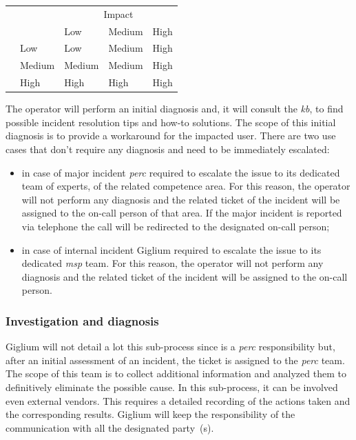 \begin{table}[H]
	\centering
	\begin{tabular}{ | l | l | l | l | l | }
		\cline{3-5}
		\multicolumn{2}{c|}{}& \multicolumn{3}{|c|}{Impact}  \\ \cline{3-5}
		\multicolumn{2}{c|}{} &Low & Medium  & High \\ \hline
		\multirow{3}{*}{\rotatebox{90}{\tiny Urgency\,}} & Low & \cellcolor{green}Low & \cellcolor{yellow}Medium & \cellcolor{red}High\\ \cline{2-5}
		&   Medium & \cellcolor{yellow}Medium & \cellcolor{yellow}Medium & \cellcolor{red}High \\ \cline{2-5}
		&  High & \cellcolor{red}High & \cellcolor{red}High & \cellcolor{red}High \\ \hline
	\end{tabular}
	\label{tab:incident-priority}
\end{table}

The operator will perform an initial diagnosis and, it will consult the \textit{\gls{kb}}, to find possible incident resolution tips and how-to solutions. The scope of this initial diagnosis is to provide a workaround for the impacted user. There are two use cases that don't require any diagnosis and need to be immediately escalated:

\begin{itemize}
	\item in case of major incident \textit{\gls{perc}} required to escalate the issue to its dedicated team of experts, of the related competence area. For this reason, the operator will not perform any diagnosis and the related ticket of the incident will be assigned to the on-call person of that area. If the major incident is reported via telephone the call will be redirected to the designated on-call person; 
	\item in case of internal incident Giglium required to escalate the issue to its dedicated \textit{\gls{msp}} team. For this reason, the operator will not perform any diagnosis and the related ticket of the incident will be assigned to the on-call person. 
\end{itemize}

\subsubsection{Investigation and diagnosis}
Giglium will not detail a lot this sub-process since is a \textit{\gls{perc}} responsibility but, after an initial assessment of an incident, the ticket is assigned to the \textit{\gls{perc}} team. The scope of this team is to collect additional information and analyzed them to definitively eliminate the possible cause. In this sub-process, it can be involved even external vendors. This requires a detailed recording of the actions taken and the corresponding results. 
Giglium will keep the responsibility of the communication with all the designated party~(s).

